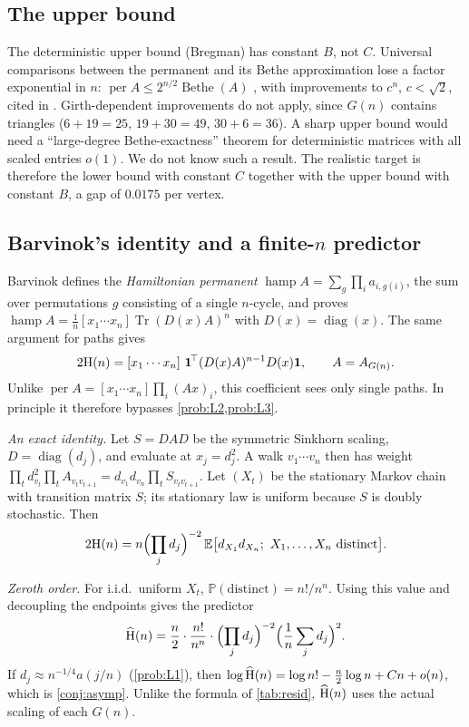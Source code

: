 \subsection{The upper bound}
The deterministic upper bound (Bregman) has constant $B$, not $C$. Universal comparisons
between the permanent and its Bethe approximation lose a factor exponential in $n$:
$\operatorname{per}A\le 2^{n/2}\operatorname{Bethe}(A)$ \cite{AnariRezaei}, with
improvements to $c^n$, $c<\sqrt2$, cited in \cite{DongJain}. Girth-dependent
improvements \cite{DongJain} do not apply, since $G(n)$ contains triangles
($6+19=25$, $19+30=49$, $30+6=36$). A sharp upper bound would need a ``large-degree
Bethe-exactness'' theorem for deterministic matrices with all scaled entries $o(1)$.
We do not know such a result. The realistic target is therefore the lower bound with
constant $C$ together with the upper bound with constant $B$, a gap of $0.0175$ per vertex.

\subsection{Barvinok's identity and a finite-$n$ predictor}\label{subsec:barvinok}
Barvinok \cite[Lemma~4.2]{Barvinok} defines the \emph{Hamiltonian permanent}
$\operatorname{hamp}A=\sum_{g}\prod_ia_{i,g(i)}$, the sum over permutations $g$ consisting of a
single $n$-cycle, and proves
$\operatorname{hamp}A=\frac1n[x_1\cdots x_n]\operatorname{Tr}(D(x)A)^n$ with
$D(x)=\operatorname{diag}(x)$. The same argument for paths gives
\[
2\mathrm{H}(n)=[x_1\cdots x_n]\ \mathbf 1^{\!\top}(D(x)A)^{n-1}D(x)\mathbf 1,\qquad A=A_{G(n)} .
\]
Unlike $\operatorname{per}A=[x_1\cdots x_n]\prod_i(Ax)_i$, this coefficient sees only single
paths. In principle it therefore bypasses \cref{prob:L2,prob:L3}.

\emph{An exact identity.} Let $S=DAD$ be the symmetric Sinkhorn scaling, $D=\operatorname{diag}(d_j)$,
and evaluate at $x_j=d_j^2$. A walk $v_1\cdots v_n$ then has weight
$\prod_t d_{v_t}^2\prod_tA_{v_tv_{t+1}}=d_{v_1}d_{v_n}\prod_tS_{v_tv_{t+1}}$. Let $(X_t)$ be the stationary
Markov chain with transition matrix $S$; its stationary law is uniform because $S$ is doubly
stochastic. Then
\begin{equation}\label{eq:markov}
2\Ham(n)=n\Bigl(\prod_jd_j\Bigr)^{-2}\,\mathbb{E}\bigl[d_{X_1}d_{X_n};\ X_1,\dots,X_n\text{ distinct}\bigr].
\end{equation}

\emph{Zeroth order.} For i.i.d.\ uniform $X_t$, $\mathbb{P}(\text{distinct})=n!/n^n$.
Using this value and decoupling the endpoints gives the predictor
\[
\widehat{\mathrm{H}}(n)=\frac n2\cdot\frac{n!}{n^n}\cdot\Bigl(\prod_jd_j\Bigr)^{-2}\Bigl(\frac1n\sum_jd_j\Bigr)^{2}.
\]
If $d_j\approx n^{-1/4}a(j/n)$ (\cref{prob:L1}), then
$\log\widehat{\mathrm{H}}(n)=\log n!-\frac n2\log n+Cn+o(n)$, which is \cref{conj:asymp}. Unlike the formula
of \cref{tab:resid}, $\widehat{\mathrm{H}}(n)$ uses the actual scaling of each $G(n)$.

